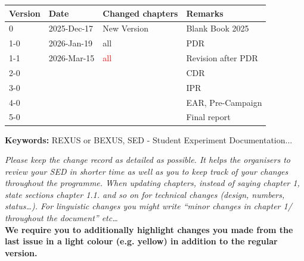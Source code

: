\documentclass[
  a4paper,
  11pt,
  openany,
  parskip,
  toc=totoc,
  listof=totoc,
  bibliography=totoc
]{scrreprt}
\newcommand{\dos}{\textcolor{red}}
\begin{document}
\thispagestyle{empty}
\newpage


 \begin{tabular}{|l|l|l|l|}
    \hline
    \textbf{Version}        &   \textbf{Date}   & \textbf{Changed chapters} & \textbf{Remarks}  \\\midrule
    \hline
    0       &   2025-Dec-17      &   New Version     &   Blank Book 2025 \\\hline
    1-0       & 2026-Jan-19      &   all             &   PDR \\\hline
   \rowcolor{yellow} 1-1       & 2026-Mar-15       &   \dos{all}             &  Revision after PDR \\\hline
    2-0       &                   &                   &   CDR \\\hline
    3-0       &                   &                   &   IPR \\\hline
    4-0       &                   &                   &   EAR, Pre-Campaign \\\hline
    5-0       &                   &                   &   Final report \\ \hline
 \end{tabular}

\textbf{Keywords:} REXUS or BEXUS, SED - Student Experiment Documentation...

\textit{Please keep the change record as detailed as possible. It helps the
organisers to review your SED in shorter time as well as you to keep track of
your changes throughout the programme.
When updating chapters, instead of saying chapter 1, state sections chapter
1.1. and so on for technical changes (design, numbers, status…). For
linguistic changes you might write “minor changes in chapter 1/ throughout the
document” etc… } \\
\textbf{We require you to additionally highlight changes you made from the last
issue in a light colour (e.g. yellow) in addition to the regular version.}


\tableofcontents
\newpage

\listoffigures
\newpage

\listoftables
\newpage

\cleardoublepage
\newpage

\cleardoublepage
\newpage
\end{document}
